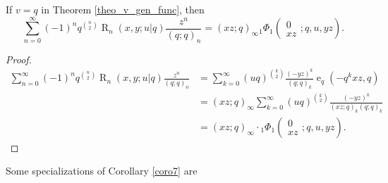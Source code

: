 \documentclass{cimart}
\DeclareMathOperator{\ope}{e}
\DeclareMathOperator{\opR}{R}
\begin{document}
\begin{corollary}\label{coro7}
If $v=q$ in Theorem \ref{theo_v_gen_func}, then
\begin{equation}
    \sum_{n=0}^{\infty}(-1)^nq^{\binom{n}{2}}\opR_{n}(x,y;u|q)\frac{z^n}{(q;q)_{n}}=(xz;q)_{\infty}{}_{1}\Phi_{1}\left(
        \begin{array}{c}
             0 \\
             xz
        \end{array};
        q,u,yz
        \right).
\end{equation}
\end{corollary}
\begin{proof}
\begin{align*}
    \sum_{n=0}^{\infty}(-1)^nq^{\binom{n}{2}}\opR_{n}(x,y;u|q)\frac{z^n}{(q;q)_{n}}&=\sum_{k=0}^{\infty}\left(uq\right)^{\binom{k}{2}}\frac{(-yz)^k}{(q;q)_{k}}\ope_{q}\left(-q^{k}xz,q\right)\\
    &=(xz;q)_{\infty}\sum_{k=0}^{\infty}\left(uq\right)^{\binom{k}{2}}\frac{(-yz)^k}{(xz;q)_{k}(q;q)_{k}}\\
    &=(xz;q)_{\infty}\cdot{}_{1}\Phi_{1}\left(
        \begin{array}{c}
             0 \\
             xz
        \end{array};
        q,u,yz
        \right).
\end{align*}    
\end{proof}
Some specializations of Corollary \ref{coro7} are
\end{document}
